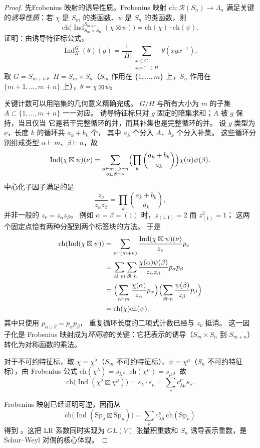 \begin{proof}
先Frobenius 映射的诱导性质。Frobenius 映射 $\mathrm{ch}:\mathcal R(S_n)\to\Lambda_n$ 满足关键的\emph{诱导性质}：若 $\chi$ 是 $S_m$ 的类函数、$\psi$ 是 $S_n$ 的类函数，则
\[
\mathrm{ch}\bigl(\operatorname{Ind}_{S_m\times S_n}^{S_{m+n}}(\chi\boxtimes\psi)\bigr)=\mathrm{ch}(\chi)\cdot\mathrm{ch}(\psi).
\]
证明：由诱导特征标公式，
\[
\operatorname{Ind}_{H}^{G}(\theta)(g)=\frac{1}{|H|}\sum_{\substack{x\in G\\xgx^{-1}\in H}}\theta(xgx^{-1}),
\]
取 $G=S_{m+n}$，$H=S_m\times S_n$（$S_m$ 作用在 $\{1,\dots,m\}$ 上，$S_n$ 作用在 $\{m+1,\dots,m+n\}$ 上），$\theta=\chi\boxtimes\psi$。

关键计数可以用陪集的几何意义精确完成。
$G/H$ 与所有大小为 $m$ 的子集 $A\subset\{1,\dots,m+n\}$ 一一对应。
诱导特征标只对 $g$ 固定的陪集求和；$A$ 被 $g$ 保持，当且仅当
它是若干完整循环的并，而其补集也是完整循环的并。
设 $g$ 类型为 $\nu$，长度 $k$ 的循环共 $a_k+b_k$ 个，
其中 $a_k$ 个分入 $A$、$b_k$ 个分入补集。
这些循环分别组成类型 $\alpha\vdash m$、$\beta\vdash n$，故
\[
\operatorname{Ind}(\chi\boxtimes\psi)(\nu)
=\sum_{\substack{\alpha\vdash m,\ \beta\vdash n\\
\alpha\sqcup\beta=\nu}}
\Bigl(\prod_k\binom{a_k+b_k}{a_k}\Bigr)
\chi(\alpha)\psi(\beta).
\]
中心化子因子满足的是
\[
\frac{z_\nu}{z_\alpha z_\beta}
=\prod_k\binom{a_k+b_k}{a_k},
\]
并非一般的 $z_\nu=z_\alpha z_\beta$。
例如 $\alpha=\beta=(1)$ 时，$z_{(1,1)}=2$ 而 $z_{(1)}^2=1$；
这两个固定点恰有两种分配到两个标签块的方法。
于是
\begin{align*}
\mathrm{ch}(\operatorname{Ind}(\chi\boxtimes\psi))
&=\sum_{\nu\vdash(m+n)}
\frac{\operatorname{Ind}(\chi\boxtimes\psi)(\nu)}{z_\nu}p_\nu\\
&=\sum_{\alpha\vdash m}\sum_{\beta\vdash n}
\frac{\chi(\alpha)\psi(\beta)}{z_\alpha z_\beta}p_\alpha p_\beta\\
&=\Bigl(\sum_{\alpha\vdash m}\frac{\chi(\alpha)}{z_\alpha}p_\alpha\Bigr)
\Bigl(\sum_{\beta\vdash n}\frac{\psi(\beta)}{z_\beta}p_\beta\Bigr)\\
&=\mathrm{ch}(\chi)\mathrm{ch}(\psi).
\end{align*}
其中只使用 $p_{\alpha\sqcup\beta}=p_\alpha p_\beta$，
重复循环长度的二项式计数已经与 $z_\nu$ 抵消。
这一因子化是 Frobenius 映射成为\emph{环同态}的关键：它把表示的诱导（$S_m\times S_n$ 到 $S_{m+n}$）转化为对称函数的乘法。

对于不可约特征标，取 $\chi=\chi^\lambda$（$S_m$ 不可约特征标）、$\psi=\chi^\mu$（$S_n$ 不可约特征标），由 Frobenius 公式 $\mathrm{ch}(\chi^\lambda)=s_\lambda$、$\mathrm{ch}(\chi^\mu)=s_\mu$，故
\[
\mathrm{ch}\bigl(\operatorname{Ind}(\chi^\lambda\boxtimes\chi^\mu)\bigr)=s_\lambda\cdot s_\mu=\sum_\nu c_{\lambda\mu}^\nu s_\nu.
\]

Frobenius 映射已经证明可逆，因而从
\[
\mathrm{ch}\bigl(\operatorname{Ind}(\mathrm{Sp}_\lambda\boxtimes\mathrm{Sp}_\mu)\bigr)=\sum_\nu c_{\lambda\mu}^\nu\,\mathrm{ch}(\mathrm{Sp}_\nu)
\]
得到 。这把 LR 系数同时实现为 $GL(V)$ 张量积重数和 $S_n$ 诱导表示重数，是 Schur--Weyl 对偶的核心体现。
\end{proof}



